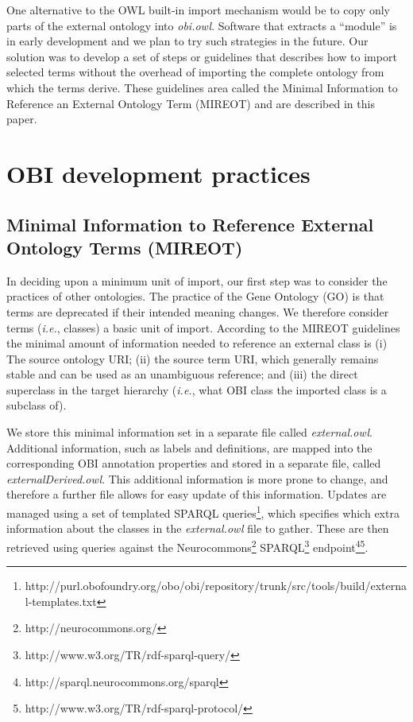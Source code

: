 \documentclass{elsart}       %
\begin{document}
One alternative to the OWL built-in import mechanism would be to copy only parts of the external ontology into \emph{obi.owl}. Software that extracts a ``module''\cite{module} is in early development and we plan to try such strategies in the future. %
Our solution was to develop a set of steps or guidelines that describes how to import selected terms without the overhead of importing the complete ontology from which the terms derive.
These guidelines area called the Minimal Information to Reference an External Ontology Term (MIREOT) and are described in this paper.

\section{OBI development practices}


\subsection{Minimal Information to Reference External Ontology Terms (MIREOT)}

In deciding upon a minimum unit of import, our first step was to consider the practices of other ontologies.
The practice of the Gene Ontology (GO)\cite{go} is that terms are deprecated if their intended meaning changes\cite{deprecated}.
We therefore consider terms (\emph{i.e.}, classes) a basic unit of import.
According to the MIREOT guidelines the minimal amount of information needed to reference an external class is (i) The source ontology URI; (ii) the source term URI, which generally remains stable and can be used as an unambiguous reference; and (iii) the direct superclass in the target hierarchy (\emph{i.e.}, what OBI class the imported class is a subclass of).

We store this minimal information set in a separate file called \emph{external.owl}. 
Additional information, such as labels and definitions, are mapped into the corresponding OBI annotation properties and stored in a separate file, called \emph{externalDerived.owl}. This additional information is more prone to change, and therefore a further file allows for easy update of this information.
Updates are managed using a set of templated SPARQL queries\footnote{http://purl.obofoundry.org/obo/obi/repository/trunk/src/tools/build/external-templates.txt}, which specifies which extra information about the classes in the \emph{external.owl} file to gather.
These are then retrieved using queries against the Neurocommons\footnote{http://neurocommons.org/} SPARQL\footnote{http://www.w3.org/TR/rdf-sparql-query/} endpoint\footnote{http://sparql.neurocommons.org/sparql}\footnote{http://www.w3.org/TR/rdf-sparql-protocol/}. 
\end{document}
